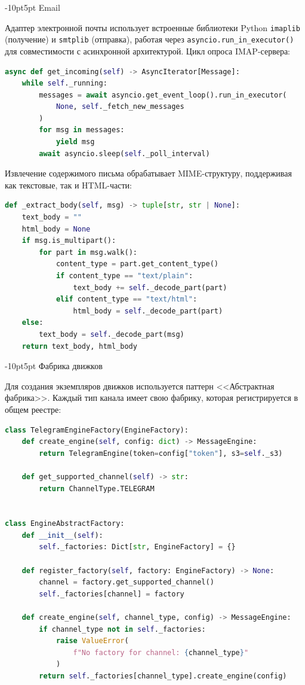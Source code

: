 \documentclass[12pt,a4paper]{report}
\makeatletter
\renewcommand{\subsection}{%
  \@startsection{subsection}{2}{\z@}%
  {-10pt}{5pt}%
  {\normalfont\bfseries\large}}
\makeatother
\begin{document}
\subsection{Email}

Адаптер электронной почты использует встроенные библиотеки Python \texttt{imaplib} (получение) и \texttt{smtplib} (отправка), работая через \texttt{asyncio.run\_in\_executor()} для совместимости с асинхронной архитектурой. Цикл опроса IMAP-сервера:

\begin{lstlisting}[language=Python]
async def get_incoming(self) -> AsyncIterator[Message]:
    while self._running:
        messages = await asyncio.get_event_loop().run_in_executor(
            None, self._fetch_new_messages
        )
        for msg in messages:
            yield msg
        await asyncio.sleep(self._poll_interval)
\end{lstlisting}

Извлечение содержимого письма обрабатывает MIME-структуру, поддерживая как текстовые, так и HTML-части:

\begin{lstlisting}[language=Python]
def _extract_body(self, msg) -> tuple[str, str | None]:
    text_body = ""
    html_body = None
    if msg.is_multipart():
        for part in msg.walk():
            content_type = part.get_content_type()
            if content_type == "text/plain":
                text_body += self._decode_part(part)
            elif content_type == "text/html":
                html_body = self._decode_part(part)
    else:
        text_body = self._decode_part(msg)
    return text_body, html_body
\end{lstlisting}

\subsection{Фабрика движков}

Для создания экземпляров движков используется паттерн <<Абстрактная фабрика>>. Каждый тип канала имеет свою фабрику, которая регистрируется в общем реестре:

\begin{lstlisting}[language=Python]
class TelegramEngineFactory(EngineFactory):
    def create_engine(self, config: dict) -> MessageEngine:
        return TelegramEngine(token=config["token"], s3=self._s3)

    def get_supported_channel(self) -> str:
        return ChannelType.TELEGRAM


class EngineAbstractFactory:
    def __init__(self):
        self._factories: Dict[str, EngineFactory] = {}

    def register_factory(self, factory: EngineFactory) -> None:
        channel = factory.get_supported_channel()
        self._factories[channel] = factory

    def create_engine(self, channel_type, config) -> MessageEngine:
        if channel_type not in self._factories:
            raise ValueError(
                f"No factory for channel: {channel_type}"
            )
        return self._factories[channel_type].create_engine(config)
\end{lstlisting}
\end{document}
